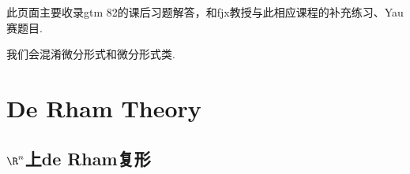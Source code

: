 \newcommand{\Supp}{\operatorname{Supp}}
\newcommand{\im}{\operatorname{im}}
\qquad 此页面主要收录gtm 82的课后习题解答，和fjx教授与此相应课程的补充练习、Yau赛题目.\par
\qquad 我们会混淆微分形式和微分形式类.

\section{De Rham Theory}
\subsection{$\R^{n}$上de Rham复形}
